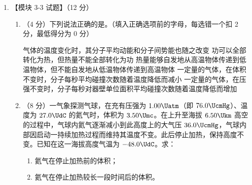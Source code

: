 \documentclass[\gkver]{gaokaozhenti}
\begin{document}
\begin{enumerate}
{因此，所求的最小匀强磁场区域是分别以 B 和 D 为圆心、$a$ 为半径的两个四分之一圆周 AEC 和 AFC 所围成的，其面积为 $S=2\left(\frac{1}{4}\pi a^{2}-\frac{1}{2}a^{2}\right)=\frac{\pi-2}{2}a^{2}$。

}

\item
【模块 3-3 试题】（12 分）

\begin{enumerate}
	\item
	（4 分）下列说法正确的是。（填入正确选项前的字母，每选错一个扣 2 分，最低得分为 0 分）

	{气体的温度变化时，其分子平均动能和分子间势能也随之改变}
	{功可以全部转化为热，但热量不能全部转化为功}
	{热量能够自发地从高温物体传递到低温物体，但不能自发地从低温物体传递到高温物体}
	{一定量的气体，在体积不变时，分子每秒平均碰撞次数随着温度降低而减小}
	{一定量的气体，在压强不变时，分子每秒对器壁单位面积平均碰撞次数随着温度降低而增加}
	\item
	（8 分）一气象探测气球，在充有压强为 $1.00\Uatm$（即 $76.0\UcmHg$）、温度为 $27.0\UdC$ 的氦气时，体积为 $3.50\Umc$。在上升至海拔 $6.50\Ukm$ 高空的过程中，气球内氦气逐渐减小到此高度上的大气压 $36.0\UcmHg$，气球内部因启动一持续加热过程而维持其温度不变。此后停止加热，保持高度不变。已知在这一海拔高度气温为 $-48.0\UdC$。求：
	\begin{enumerate}
		\item
		氦气在停止加热前的体积；
		\item
		氦气在停止加热较长一段时间后的体积。
	\end{enumerate}
\end{enumerate}


\end{enumerate}
\end{document}
